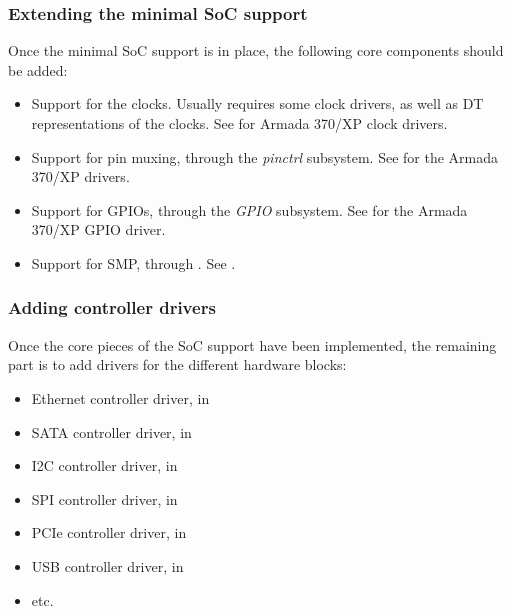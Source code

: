 \begin{frame}
  \frametitle{Extending the minimal SoC support}

  Once the minimal SoC support is in place, the following core
  components should be added:
  \begin{itemize}
  \item Support for the clocks. Usually requires some clock drivers,
    as well as DT representations of the clocks. See
     for Armada 370/XP clock drivers.
  \item Support for pin muxing, through the {\em pinctrl}
    subsystem. See  for the Armada 370/XP
    drivers.
  \item Support for GPIOs, through the {\em GPIO} subsystem. See
     for the Armada 370/XP GPIO
    driver.
  \item Support for SMP, through . See
    .
  \end{itemize}
\end{frame}

\begin{frame}
  \frametitle{Adding controller drivers}
  Once the core pieces of the SoC support have been implemented, the
  remaining part is to add drivers for the different hardware blocks:
  \begin{itemize}
  \item Ethernet controller driver, in 
  \item SATA controller driver, in 
  \item I2C controller driver, in 
  \item SPI controller driver, in 
  \item PCIe controller driver, in 
  \item USB controller driver, in 
  \item etc.
  \end{itemize}
\end{frame}

